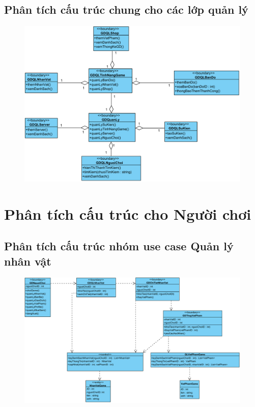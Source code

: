 \documentclass[3p]{elsarticle}
\begin{document}
\subsection{Phân tích cấu trúc chung cho các lớp quản lý}
\begin{figure}[!htbp]
	\hspace*{-.5in}
	\centering
	\includegraphics[scale=.55]{images/structure-pdfs/admin/quanly.pdf}
\end{figure}
\newpage

\section{Phân tích cấu trúc cho Người chơi}
\subsection{Phân tích cấu trúc nhóm use case Quản lý nhân vật}
\begin{figure}[!htbp]
	\hspace*{-.5in}
	\centering
	\includegraphics[scale=.55]{images/structure-pdfs/gamer/CharacterManagement.pdf}
\end{figure}
\newpage
\end{document}
